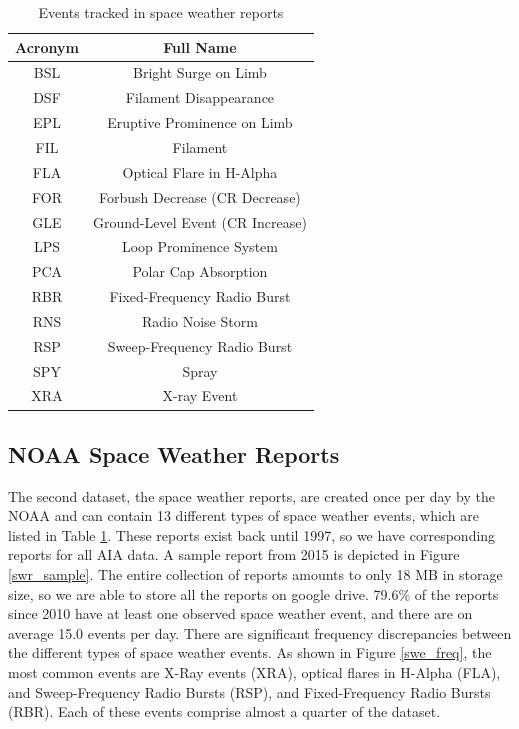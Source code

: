 \documentclass[12pt, letterpaper]{article}
\begin{document}
\begin{table}
\begin{center}
 \begin{tabular}{||c | c ||} 
 \hline
 Acronym & Full Name \\ [0.5ex] 
 \hline\hline
 BSL & Bright Surge on Limb \\
 \hline
 DSF & Filament Disappearance \\ 
 \hline
    EPL & Eruptive Prominence on Limb\\
 \hline
    FIL & Filament\\
 \hline
    FLA & Optical Flare in H-Alpha\\
 \hline
    FOR & Forbush Decrease (CR Decrease) \\
 \hline
    GLE & Ground-Level Event (CR Increase) \\
 \hline
    LPS & Loop Prominence System\\
 \hline
    PCA & Polar Cap Absorption\\
 \hline
    RBR & Fixed-Frequency Radio Burst\\
 \hline
    RNS & Radio Noise Storm\\
 \hline
    RSP & Sweep-Frequency Radio Burst\\
 \hline
    SPY & Spray\\
 \hline
    XRA & X-ray Event \\
 \hline
\end{tabular}
\caption{Events tracked in space weather reports}
\label{space_weather_events}
\end{center}
\end{table}

\subsection*{NOAA Space Weather Reports}

The second dataset, the space weather reports, are created once per day by the NOAA and can contain 13 different types of space weather events, which are listed in Table \ref{space_weather_events}. These reports exist back until 1997, so we have corresponding reports for all AIA data. A sample report from 2015 is depicted in Figure \ref{swr_sample}. The entire collection of reports amounts to only 18 MB in storage size, so we are able to store all the reports on google drive. 79.6\% of the reports since 2010 have at least one observed space weather event, and there are on average 15.0 events per day. There are significant frequency discrepancies between the different types of space weather events. As shown in Figure \ref{swe_freq}, the most common events are X-Ray events (XRA), optical flares in H-Alpha (FLA), and Sweep-Frequency Radio Bursts (RSP), and Fixed-Frequency Radio Bursts (RBR). Each of these events comprise almost a quarter of the dataset. 
\end{document}
